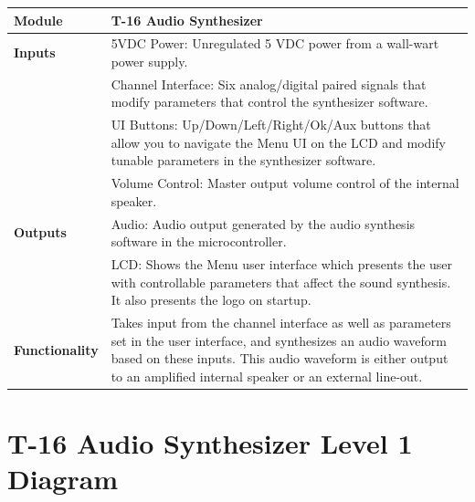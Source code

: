 \documentclass{article}
\begin{document}
\begin{tabular}{|p{1in}|p{5in}|}
\hline
\textbf{Module} & T-16 Audio Synthesizer \\
\hline
\textbf{Inputs}& 5VDC Power: Unregulated 5 VDC power from a wall-wart power supply.\\
	     & Channel Interface: Six analog/digital paired signals that modify parameters that control the synthesizer software. \\
      	     & UI Buttons: Up/Down/Left/Right/Ok/Aux buttons that allow you to navigate the Menu UI on the LCD and modify tunable parameters in the synthesizer software.\\
	     & Volume Control: Master output volume control of the internal speaker.\\
\hline
\textbf{Outputs}& Audio: Audio output generated by the audio synthesis software in the microcontroller.\\ 
	      & LCD: Shows the Menu user interface which presents the user with controllable parameters that affect the sound synthesis. It also presents the logo on startup. \\
\hline
\textbf{Functionality}& Takes input from the channel interface as well as parameters set in the user interface, and synthesizes an audio waveform based on these inputs. This audio waveform is either output to an amplified internal speaker or an external line-out.\\
\hline
\end{tabular}

\section{T-16 Audio Synthesizer Level 1 Diagram}
\end{document}
